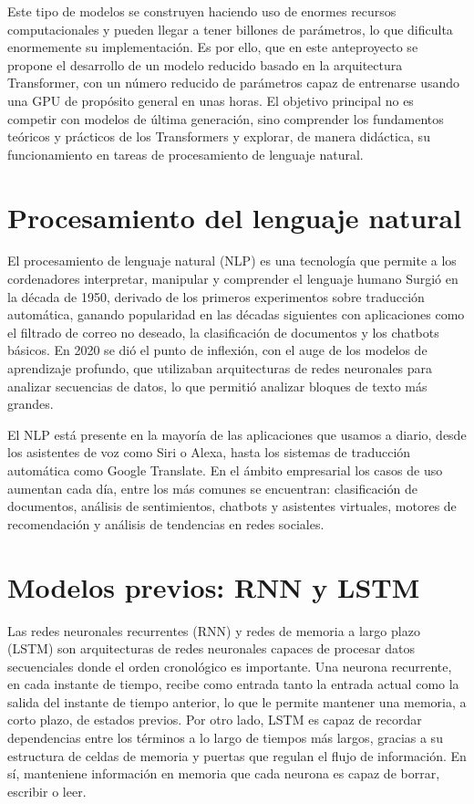 \documentclass[11pt]{book}
\begin{document}
Este tipo de modelos se construyen haciendo uso de enormes recursos computacionales y pueden llegar a tener billones de parámetros, lo que dificulta enormemente su implementación. Es por ello, que en este anteproyecto se propone el desarrollo de un modelo reducido basado en la arquitectura Transformer, con un número reducido de parámetros capaz de entrenarse usando una GPU de propósito general en unas horas. El objetivo principal no es competir con modelos de última generación, sino comprender los fundamentos teóricos y prácticos de los Transformers y explorar, de manera didáctica, su funcionamiento en tareas de procesamiento de lenguaje natural.

\section{Procesamiento del lenguaje natural}

El procesamiento de lenguaje natural (NLP) es una tecnología que permite a los cordenadores interpretar, manipular y comprender el lenguaje humano Surgió en la década de 1950, derivado de los primeros experimentos sobre traducción automática, ganando popularidad en las décadas siguientes con aplicaciones como el filtrado de correo no deseado, la clasificación de documentos y los chatbots básicos. En 2020 se dió el punto de inflexión, con el auge de los modelos de aprendizaje profundo, que utilizaban arquitecturas de redes neuronales para analizar secuencias de datos, lo que permitió analizar bloques de texto más grandes.

El NLP está presente en la mayoría de las aplicaciones que usamos a diario, desde los asistentes de voz como Siri o Alexa, hasta los sistemas de traducción automática como Google Translate. En el ámbito empresarial los casos de uso aumentan cada día, entre los más comunes se encuentran: clasificación de documentos, análisis de sentimientos, chatbots y asistentes virtuales, motores de recomendación y análisis de tendencias en redes sociales.

\section{Modelos previos: RNN y LSTM}

Las redes neuronales recurrentes (RNN) y redes de memoria a largo plazo (LSTM) son arquitecturas de redes neuronales capaces de procesar datos secuenciales donde el orden cronológico es importante. Una neurona recurrente, en cada instante de tiempo, recibe como entrada tanto la entrada actual como la salida del instante de tiempo anterior, lo que le permite mantener una memoria, a corto plazo, de estados previos. Por otro lado, LSTM es capaz de recordar dependencias entre los términos a lo largo de tiempos más largos, gracias a su estructura de celdas de memoria y puertas que regulan el flujo de información. En sí, manteniene información en memoria que cada neurona es capaz de borrar, escribir o leer. 
\end{document}
